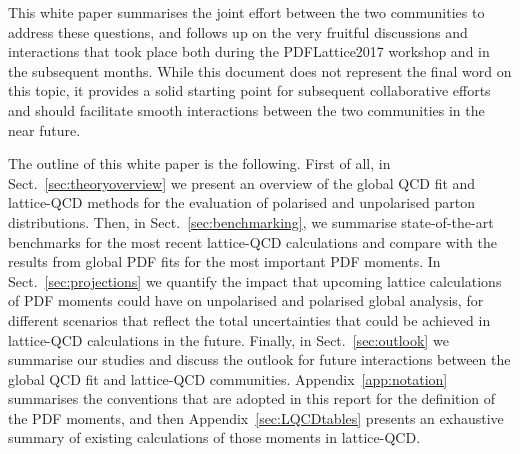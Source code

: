 This white paper summarises the joint
effort between the two communities to address these questions, 
and follows up on the very fruitful discussions and interactions that took place both during 
the PDFLattice2017 workshop and in the subsequent months.
%
While this document does not represent the final word on this topic,
it provides a solid starting point for subsequent collaborative efforts
and should facilitate smooth 
interactions between the two communities in the near future.

The outline of this white paper is the following.
%
First of all, in Sect.~\ref{sec:theoryoverview} we present an overview of
the global QCD fit and lattice-QCD methods for the evaluation
of polarised and unpolarised parton distributions.
%
Then, in Sect.~\ref{sec:benchmarking},
we summarise state-of-the-art benchmarks for the most
recent lattice-QCD calculations and compare with the results from global PDF fits
for the most important PDF moments.
%
In Sect.~\ref{sec:projections} we quantify the impact that
upcoming lattice calculations of PDF moments could have on unpolarised
and polarised global analysis, for different scenarios
that reflect the total uncertainties that could be achieved in lattice-QCD 
calculations in the future.
%
Finally, in Sect.~\ref{sec:outlook} we summarise our studies
and discuss the outlook for future interactions between
the global QCD fit and lattice-QCD communities.
%
Appendix~\ref{app:notation} summarises the conventions
that are adopted in this report for the definition of the PDF
moments, and then
Appendix~\ref{sec:LQCDtables} presents an exhaustive summary of existing calculations
of those moments in lattice-QCD.
